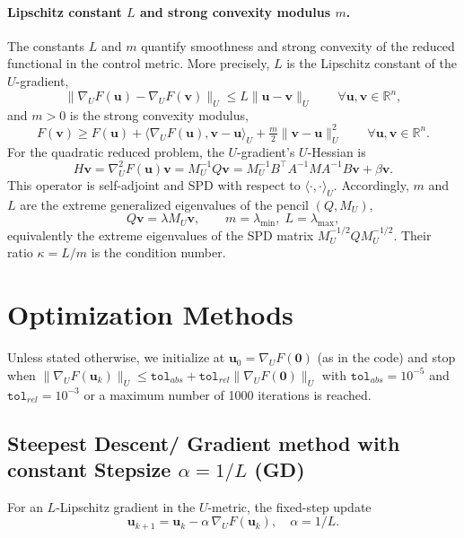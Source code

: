 \documentclass[11pt,a4paper]{article}
\begin{document}
\paragraph{Lipschitz constant $L$ and strong convexity modulus $m$.}
The constants $L$ and $m$ quantify smoothness and strong convexity of the reduced functional in the control metric. More precisely, $L$ is the Lipschitz constant of the $U$-gradient,
\begin{equation}
  \|\nabla_U F(\mathbf{u})-\nabla_U F(\mathbf{v})\|_U \le L\|\mathbf{u}-\mathbf{v}\|_U \qquad \forall \mathbf{u},\mathbf{v}\in\mathbb{R}^n,
\end{equation}
and $m>0$ is the strong convexity modulus,
\begin{equation}
  F(\mathbf{v}) \ge F(\mathbf{u}) + \langle \nabla_U F(\mathbf{u}),\mathbf{v}-\mathbf{u}\rangle_U + \tfrac{m}{2}\|\mathbf{v}-\mathbf{u}\|_U^2 \qquad \forall \mathbf{u},\mathbf{v}\in\mathbb{R}^n.
\end{equation}
For the quadratic reduced problem, the $U$-gradient's $U$-Hessian is
\begin{equation}
  H\mathbf{v} = \nabla_U^2 F(\mathbf{u})\mathbf{v} = M_U^{-1}Q\mathbf{v} = M_U^{-1} B^\top A^{-1} M A^{-1} B\mathbf{v} + \beta\mathbf{v}.
\end{equation}
This operator is self-adjoint and SPD with respect to $\langle\cdot,\cdot\rangle_U$. Accordingly, $m$ and $L$ are the extreme generalized eigenvalues of the pencil $(Q,M_U)$,
\begin{equation}
  Q\mathbf{v} = \lambda M_U\mathbf{v}, \qquad m=\lambda_{\min},\; L=\lambda_{\max},
\end{equation}
equivalently the extreme eigenvalues of the SPD matrix $M_U^{-1/2}QM_U^{-1/2}$. Their ratio $\kappa=L/m$ is the condition number.

\section{Optimization Methods}
Unless stated otherwise, we initialize at $\mathbf{u}_0=\nabla_U F(\mathbf{0})$ (as in the code) and stop when $\|\nabla_U F(\mathbf{u}_k)\|_U\le\texttt{tol}_{abs}+\texttt{tol}_{rel}\|\nabla_U F(\mathbf{0})\|_U$ with $\texttt{tol}_{abs}=10^{-5}$ and $\texttt{tol}_{rel}=10^{-3}$ or a maximum number of 1000 iterations is reached.
\subsection{Steepest Descent/ Gradient method with constant Stepsize \(\alpha = 1/L\) (GD)}
For an \(L\)-Lipschitz gradient in the \(U\)-metric, the fixed-step update
\begin{equation}
  \mathbf{u}_{k+1} = \mathbf{u}_k - \alpha\, \nabla_U F(\mathbf{u}_k), \quad \alpha = 1/L.
\end{equation}
\end{document}

